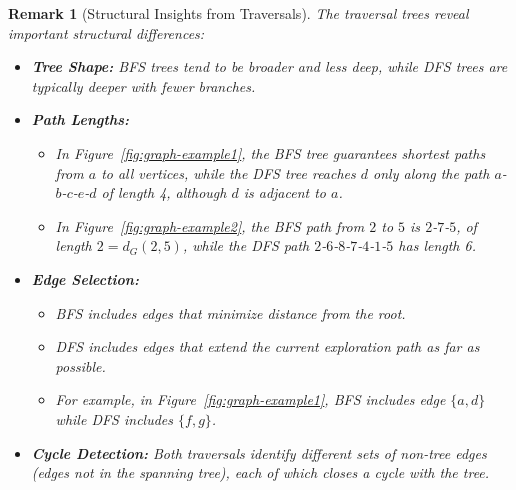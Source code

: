 \documentclass{article}
\newtheorem{remark}{Remark}
\theoremstyle{definition}
\begin{document}
\begin{remark}[Structural Insights from Traversals]
The traversal trees reveal important structural differences:
\begin{itemize}
\item \textbf{Tree Shape:} BFS trees tend to be broader and less deep, while DFS trees are typically deeper with fewer branches.

\item \textbf{Path Lengths:} 
  \begin{itemize}
  \item In Figure~\ref{fig:graph-example1}, the BFS tree guarantees shortest paths from $a$ to all vertices, while the DFS tree reaches $d$ only along the path $a$-$b$-$c$-$e$-$d$ of length 4, although $d$ is adjacent to $a$.
  \item In Figure~\ref{fig:graph-example2}, the BFS path from $2$ to $5$ is $2$-$7$-$5$, of length $2 = d_G(2,5)$, while the DFS path $2$-$6$-$8$-$7$-$4$-$1$-$5$ has length 6.
  \end{itemize}
  
\item \textbf{Edge Selection:}
  \begin{itemize}
  \item BFS includes edges that minimize distance from the root.
  \item DFS includes edges that extend the current exploration path as far as possible.
  \item For example, in Figure~\ref{fig:graph-example1}, BFS includes edge $\{a,d\}$ while DFS includes $\{f,g\}$.
  \end{itemize}
  
\item \textbf{Cycle Detection:} Both traversals identify different sets of non-tree edges (edges not in the spanning tree), each of which closes a cycle with the tree.
\end{itemize}
\end{remark}
\end{document}
